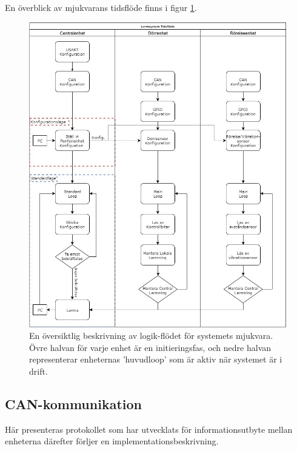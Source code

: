 \documentclass{article}
\begin{document}
En överblick av mjukvarans tidsflöde finns i figur \ref{fig:tidsflöde}.

\begin{figure}[H]
    \centering
    \includegraphics[width=1\textwidth]{figurer/TidsFlode.jpg}
    \caption{En översiktlig beskrivning av logik-flödet för systemets mjukvara. Övre halvan för varje enhet är en initieringsfas,
    och nedre halvan representerar enheternas 'huvudloop' som är aktiv när systemet är i drift.}
    \label{fig:tidsflöde}
\end{figure}

\subsection{CAN-kommunikation}
\label{can}
Här presenteras protokollet som har utvecklats för informationsutbyte mellan enheterna därefter förljer en implementationsbeskrivning.
\end{document}
